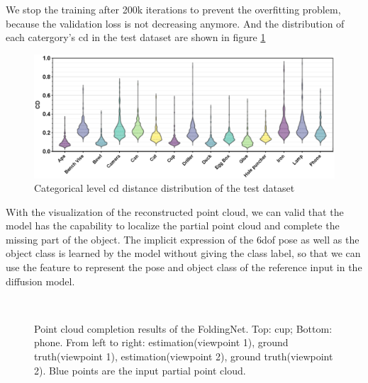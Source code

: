 \documentclass[12pt,DIV14,BCOR12mm,a4paper,footinclude=false,headinclude,parskip=half-,twoside,openright,cleardoublepage=empty,toc=index,bibliography=totoc,listof=totoc]{scrreprt}
\numberwithin{equation}{chapter}
\begin{document}
We stop the training after 200k iterations to prevent the overfitting problem, because the validation loss is not decreasing anymore. And the distribution of each catergory's \gls{cd} in the test dataset are shown in figure \ref{img:cd_cate} 

\begin{figure}[h]
	\centering
	\includegraphics[width=1.\textwidth]{img/cd_category.eps}
	\caption{Categorical level \gls{cd} distance distribution of the test dataset}
	\label{img:cd_cate}
\end{figure}



With the visualization of the reconstructed point cloud, we can valid that the model has the capability to localize the partial point cloud and complete the missing part of the object. The implicit expression of the \gls{6dof} pose as well as the object class is learned by the model without giving the class label, so that we can use the feature to represent the pose and object class of the reference input in the diffusion model.

\begin{figure}[h]
	\centering
	\\
  \centering
	\caption{Point cloud completion results of the FoldingNet. Top: cup; Bottom: phone. From left to right: estimation(viewpoint 1), ground truth(viewpoint 1), estimation(viewpoint 2), ground truth(viewpoint 2). Blue points are the input partial point cloud.}
	\label{img:comp_all}
\end{figure}
\end{document}
